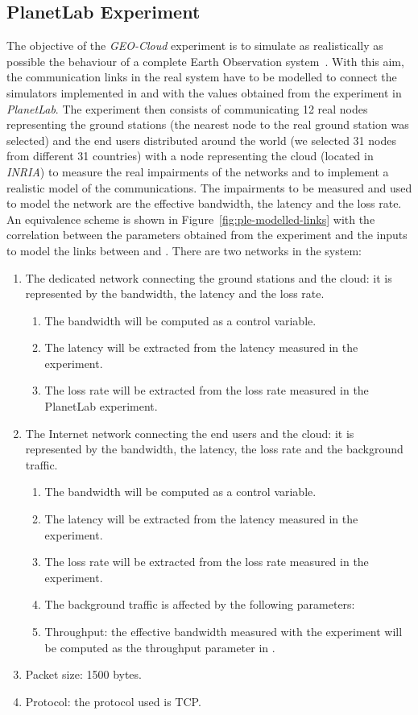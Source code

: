 \subsection{PlanetLab Experiment}

The objective of the \emph{GEO-Cloud} experiment is to simulate as realistically as possible the behaviour of a complete Earth Observation system~\cite{Gonzalez2014}. With this aim, the communication links in the real system have to be modelled to connect the simulators implemented in \vw and \bonfire with the values obtained from the experiment in \emph{PlanetLab}. The experiment then consists of communicating 12 real nodes representing the ground stations (the nearest \pl node to the real ground station was selected) and the end users distributed around the world (we selected 31 nodes from different 31 countries) with a node representing the cloud (located in \emph{INRIA}) to measure the real impairments of the networks and to implement a realistic model of the communications. The impairments to be measured and used to model the network are the effective bandwidth, the latency and the loss rate.
An equivalence scheme is shown in Figure~\ref{fig:ple-modelled-links} with the correlation between the
parameters obtained from the experiment and the inputs to model the links
between \vw and \bonfire.  There are two networks in the system:
\begin{enumerate}
\item The dedicated network connecting the ground stations and the cloud: it
  is represented by the bandwidth, the latency and the loss rate.
\begin{enumerate}
\item The bandwidth will be computed as a control variable.
\item The latency will be extracted from the latency measured in the \pl experiment.
\item The loss rate will be extracted from the loss rate measured in the PlanetLab experiment.
 \end{enumerate}
\item	The Internet network connecting the end users and the cloud: it is
  represented by the bandwidth, the latency, the loss rate and the background
  traffic.
\begin{enumerate}
\item The bandwidth will be computed as a control variable.
\item The latency will be extracted from the latency measured in the \pl experiment.
\item The loss rate will be extracted from the loss rate measured in the \pl experiment.
\item The background traffic is affected by the following parameters:
\item Throughput: the effective bandwidth measured with the \pl
experiment will be computed as the throughput parameter in \vw.
\end{enumerate}

\item Packet size: 1500 bytes.
\item Protocol: the protocol used is \ac{TCP}.
\end{enumerate}

